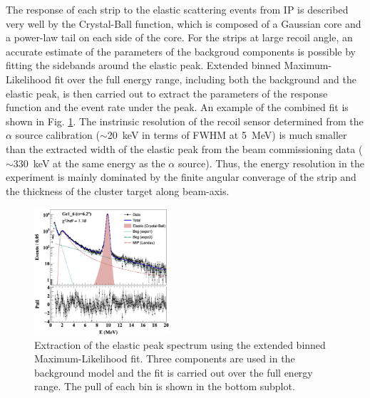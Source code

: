 \documentclass[number,5p]{elsarticle}
\begin{document}
The response of each strip to the elastic scattering events from IP is described
very well by the Crystal-Ball function\cite{crystal_ball}, which is composed of a Gaussian core and a power-law tail on each side of the core.
For the strips at large recoil angle, an accurate estimate of the parameters of
the backgroud components is possible by fitting the sidebands around the elastic peak.
Extended binned Maximum-Likelihood fit over the full energy range, including both the background and the
elastic peak, is then carried out to extract the parameters of the response function and the event rate under the peak.
An example of the combined fit is shown in Fig. \ref{fig:e_fit}.
The instrinsic resolution of the recoil sensor determined from the $\alpha$ source
calibration ($\sim$\SI{20}{\keV} in terms of FWHM at \SI{5}{\MeV}) is much smaller than the extracted width of the elastic peak from the beam commissioning data ($\sim$\SI{330}{\keV} at the same energy as the $\alpha$ source).
Thus, the energy resolution in the experiment is mainly dominated by the finite angular converage of the strip and the thickness of the cluster target along beam-axis.
\begin{figure}[b!]
  \centering
  \includegraphics[width=0.45\textwidth]{./e_fit.png}
  \caption{Extraction of the elastic peak spectrum using the extended binned
    Maximum-Likelihood fit. Three components are used in the background model
    and the fit is carried out over the full energy range. The pull of each bin
    is shown in the bottom subplot.}
  \label{fig:e_fit}
\end{figure}
\end{document}
